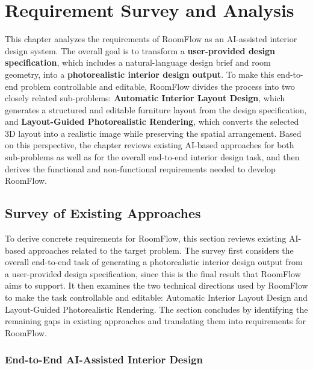 \chapter{Requirement Survey and Analysis}
\newcommand{\ucflow}[1]{\begin{minipage}[t]{\linewidth}\begin{enumerate}[leftmargin=1.2em,nosep]#1\end{enumerate}\end{minipage}}

This chapter analyzes the requirements of RoomFlow as an AI-assisted interior design system. The overall goal is to transform a \textbf{user-provided design specification}, which includes a natural-language design brief and room geometry, into a \textbf{photorealistic interior design output}. To make this end-to-end problem controllable and editable, RoomFlow divides the process into two closely related sub-problems: \textbf{Automatic Interior Layout Design}, which generates a structured and editable furniture layout from the design specification, and \textbf{Layout-Guided Photorealistic Rendering}, which converts the selected 3D layout into a realistic image while preserving the spatial arrangement. Based on this perspective, the chapter reviews existing AI-based approaches for both sub-problems as well as for the overall end-to-end interior design task, and then derives the functional and non-functional requirements needed to develop RoomFlow.

\section{Survey of Existing Approaches}\label{sec:status-survey}

To derive concrete requirements for RoomFlow, this section reviews existing AI-based approaches related to the target problem. The survey first considers the overall end-to-end task of generating a photorealistic interior design output from a user-provided design specification, since this is the final result that RoomFlow aims to support. It then examines the two technical directions used by RoomFlow to make the task controllable and editable: Automatic Interior Layout Design and Layout-Guided Photorealistic Rendering. The section concludes by identifying the remaining gaps in existing approaches and translating them into requirements for RoomFlow.

\subsection{End-to-End AI-Assisted Interior Design}\label{subsec:integrated-layout-to-visualization-workflows}

